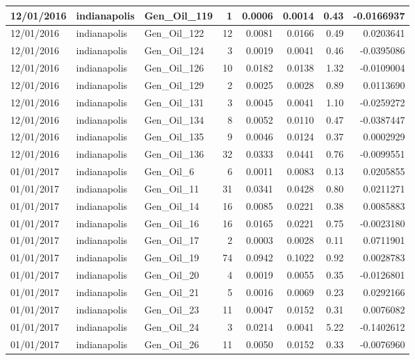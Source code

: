 \documentclass[
  letterpaper,
  DIV=11,
  numbers=noendperiod]{scrartcl}
\begin{document}
\begin{tabular}{l|l|l|r|r|r|r|r}
\hline
12/01/2016 & indianapolis & Gen\_Oil\_119 & 1 & 0.0006 & 0.0014 & 0.43 & -0.0166937\\
\hline
12/01/2016 & indianapolis & Gen\_Oil\_122 & 12 & 0.0081 & 0.0166 & 0.49 & 0.0203641\\
\hline
12/01/2016 & indianapolis & Gen\_Oil\_124 & 3 & 0.0019 & 0.0041 & 0.46 & -0.0395086\\
\hline
12/01/2016 & indianapolis & Gen\_Oil\_126 & 10 & 0.0182 & 0.0138 & 1.32 & -0.0109004\\
\hline
12/01/2016 & indianapolis & Gen\_Oil\_129 & 2 & 0.0025 & 0.0028 & 0.89 & 0.0113690\\
\hline
12/01/2016 & indianapolis & Gen\_Oil\_131 & 3 & 0.0045 & 0.0041 & 1.10 & -0.0259272\\
\hline
12/01/2016 & indianapolis & Gen\_Oil\_134 & 8 & 0.0052 & 0.0110 & 0.47 & -0.0387447\\
\hline
12/01/2016 & indianapolis & Gen\_Oil\_135 & 9 & 0.0046 & 0.0124 & 0.37 & 0.0002929\\
\hline
12/01/2016 & indianapolis & Gen\_Oil\_136 & 32 & 0.0333 & 0.0441 & 0.76 & -0.0099551\\
\hline
01/01/2017 & indianapolis & Gen\_Oil\_6 & 6 & 0.0011 & 0.0083 & 0.13 & 0.0205855\\
\hline
01/01/2017 & indianapolis & Gen\_Oil\_11 & 31 & 0.0341 & 0.0428 & 0.80 & 0.0211271\\
\hline
01/01/2017 & indianapolis & Gen\_Oil\_14 & 16 & 0.0085 & 0.0221 & 0.38 & 0.0085883\\
\hline
01/01/2017 & indianapolis & Gen\_Oil\_16 & 16 & 0.0165 & 0.0221 & 0.75 & -0.0023180\\
\hline
01/01/2017 & indianapolis & Gen\_Oil\_17 & 2 & 0.0003 & 0.0028 & 0.11 & 0.0711901\\
\hline
01/01/2017 & indianapolis & Gen\_Oil\_19 & 74 & 0.0942 & 0.1022 & 0.92 & 0.0028783\\
\hline
01/01/2017 & indianapolis & Gen\_Oil\_20 & 4 & 0.0019 & 0.0055 & 0.35 & -0.0126801\\
\hline
01/01/2017 & indianapolis & Gen\_Oil\_21 & 5 & 0.0016 & 0.0069 & 0.23 & 0.0292166\\
\hline
01/01/2017 & indianapolis & Gen\_Oil\_23 & 11 & 0.0047 & 0.0152 & 0.31 & 0.0076082\\
\hline
01/01/2017 & indianapolis & Gen\_Oil\_24 & 3 & 0.0214 & 0.0041 & 5.22 & -0.1402612\\
\hline
01/01/2017 & indianapolis & Gen\_Oil\_26 & 11 & 0.0050 & 0.0152 & 0.33 & -0.0076960\\

\end{tabular}
\end{document}
